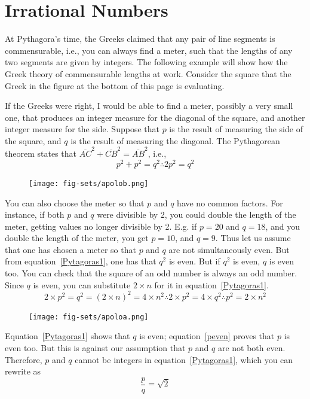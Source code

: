 \documentclass[a4paper,12pt]{book}
\begin{document}
\section{Irrational Numbers}
At Pythagora's time, the Greeks claimed that
any pair of line segments is commensurable, i.e.,
you can always find a meter,
such that the lengths of any two segments
are given by integers.  The following
example will
show how the Greek theory of commensurable lengths at work.
Consider the square that the Greek in the figure
at the bottom of this page is evaluating.


If the Greeks were right, I would be able to find a meter, possibly a very small one,
that produces an integer measure for the diagonal of the square,
and another integer measure for the side. Suppose that $p$ is the
result of measuring the side of the square, and $q$ is the result of measuring the diagonal.
The Pythagorean theorem states that
$\overline{AC}^2+\overline{CB}^2= \overline{AB}^2$, i.e.,
\begin{equation}
p^2+p^2= q^2\therefore 2p^2=q^2\label{Pytagoras1}
\end{equation}

\begin{figure}
\texttt{[image: fig-sets/apolob.png]}
\end{figure}
You can also choose the meter so that $p$ and  $q$ have no common factors. For instance,
if both $p$ and $q$ were divisible by 2, you could double the length of the meter, getting
values no longer divisible by 2. E.g. if $p=20$ and $q=18$, and you double the length of
the meter, you get $p=10$, and $q=9$. Thus let us assume that one has chosen a meter so
that $p$ and $q$ are not simultaneously even. But from equation~\ref{Pytagoras1}, one
has that $q^2$ is even. But if $q^2$ is even, $q$ is even too. You can check that
the square of an odd number is always an odd number. Since $q$ is even, you can
substitute $2\times n$ for it in equation~\ref{Pytagoras1}.
\begin{equation}
2\times p^2= q^2= (2\times n)^2= 4\times n^2 \therefore 2\times p^2= 4\times q^2
\therefore p^2= 2\times n^2
\label{peven}
\end{equation}

\begin{figure}
\begin{center}
\texttt{[image: fig-sets/apoloa.png]}
\end{center}
\end{figure}
Equation~\ref{Pytagoras1} shows that $q$ is even;
equation~\ref{peven} proves that $p$ is even too. But this is against our
assumption that $p$ and $q$ are not both even. Therefore, $p$ and $q$ cannot be
integers in equation~\ref{Pytagoras1}, which you can rewrite as
$$\frac{p}{q}=\sqrt{2}$$
\end{document}
